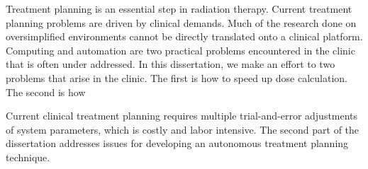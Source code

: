 
Treatment planning is an essential step in radiation therapy. Current treatment planning problems are driven by clinical demands. Much of the research done on oversimplified environments cannot be directly translated onto a clinical platform. Computing and automation are two practical problems encountered in the clinic that is often under addressed. In this dissertation, we make an effort to two problems that arise in the clinic. The first is how to speed up dose calculation. The second is how  

Current clinical treatment planning requires multiple trial-and-error adjustments of system parameters, which is costly and labor intensive. The second part of the dissertation addresses issues for developing an autonomous treatment planning technique.

